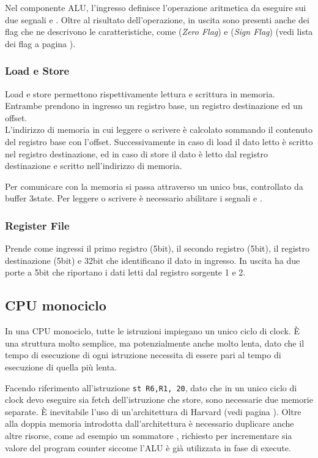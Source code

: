 \documentclass[../ace.tex]{subfiles}
\begin{document}
Nel componente ALU, l'ingresso  definisce l'operazione aritmetica da eseguire sui due segnali  e .
Oltre al risultato dell'operazione, in uscita sono presenti anche dei flag che ne descrivono le caratteristiche, come  (\textit{Zero Flag}) e  (\textit{Sign Flag})  (vedi lista dei flag a pagina \pageref{8086_flags}).

\subsubsection{Load e Store}
Load e store permettono rispettivamente lettura e scrittura in memoria.
Entrambe prendono in ingresso un registro base, un registro destinazione ed un offset.
\\
L'indirizzo di memoria in cui leggere o scrivere è calcolato sommando il contenuto del registro base con l'offset.
Successivamente in caso di load il dato letto è scritto nel registro destinazione, ed in caso di store il dato è letto dal registro destinazione e scritto nell'indirizzo di memoria.


Per comunicare con la memoria si passa attraverso un unico bus, controllato da buffer 3state. Per leggere o scrivere è necessario abilitare i segnali
 e .

\subsubsection{Register File}
Prende come ingressi il primo registro (5bit), il secondo registro (5bit), il registro destinazione (5bit) e 32bit che identificano il dato in ingresso.
In uscita ha due porte a 5bit che riportano i dati letti dal registro sorgente 1 e 2.

\def\tmono{T_\text{mono}}
\def\tmulti{T_\text{multi}}
\subsection{CPU monociclo}
In una CPU monociclo, tutte le istruzioni impiegano un unico ciclo di clock. È una struttura molto semplice, ma potenzialmente anche molto
lenta, dato che il tempo di esecuzione di ogni istruzione necessita di essere pari al tempo di esecuzione di quella più lenta.

Facendo riferimento all'istruzione \lstinline{st R6,R1, 20},
dato che in un unico ciclo di clock devo eseguire sia fetch dell'istruzione che store, sono necessarie due memorie separate.
È inevitabile l'uso di un'architettura di Harvard (vedi pagina \pageref{sec:architettura_harvard}).
Oltre alla doppia memoria introdotta dall'architettura è necessario duplicare anche altre risorse, come ad esempio un sommatore , richiesto per incrementare sia valore del program counter siccome l'ALU è già utilizzata in fase di execute.
\end{document}
